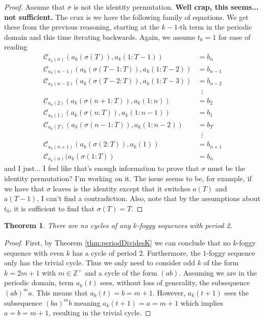 \documentclass{article}
\newtheorem{theorem}{Theorem}
\begin{document}
\begin{proof}
Assume that $\sigma$ is not the identity permutation. \textbf{Well crap, this seems... not sufficient.} The crux is we have the following family of equations. We get these from the previous reasoning, starting at the $k-1$-th term in the periodic domain and this time iterating backwards. Again, we assume $t_0 = 1$ for ease of reading
\begin{align*}
\mathcal{C}_{a_k(n)}(a_k(\sigma(T)), a_k(1:T-1)) &= b_{n} \\
\mathcal{C}_{a_k(n-1)}(a_k(\sigma(T-1:T)), a_k(1:T-2)) &= b_{n-1} \\
\mathcal{C}_{a_k(n-2)}(a_k(\sigma(T-2:T)), a_k(1:T-3)) &= b_{n-2} \\
&\;\;\vdots\\
\mathcal{C}_{a_k(2)}(a_k(\sigma(n+1:T)), a_k(1:n)) &= b_{2} \\
\mathcal{C}_{a_k(1)}(a_k(\sigma(n:T)), a_k(1:n-1)) &= b_{1} \\
\mathcal{C}_{a_k(T)}(a_k(\sigma(n-1:T)), a_k(1:n-2)) &= b_{T} \\
&\;\;\vdots\\
\mathcal{C}_{a_k(n+1)}(a_k(\sigma(2:T)), a_k(1)) &= b_{n+1} \\
\mathcal{C}_{a_k(n)}(a_k(\sigma(1:T)) &= b_{n}
\end{align*}
and I just... I feel like that's enough information to prove that $\sigma$ must be the identity permutation? I'm working on it. The issue seems to be, for example, if we have that $\sigma$ leaves is the identity except that it switches $a(T)$ and $a(T-1)$, I can't find a contradiction. Also, note that by the assumptions about $t_0$, it is sufficient to find that $\sigma(T) = T$. 

\end{proof}

\begin{theorem}
	There are no cycles of any $k$-foggy sequences with period 2.
	\label{thm:no-period-2}
\end{theorem}

\begin{proof}
	First, by Theorem \ref{thm:periodDividesK} we can conclude that no $k$-foggy sequence with even $k$ has a cycle of period $2$. Furthermore, the $1$-foggy sequence only has the trivial cycle. Thus we only need to consider odd $k$ of the form $k = 2m+1$ with $m \in \mathbb{Z}^+$ and a cycle of the form $(ab)$. Assuming we are in the periodic domain, term $a_k(t)$ sees, without loss of generality, the subsequence $(ab)^m a$. This means that $a_k(t) = b = m+1$. However, $a_k(t+1)$ sees the subsequence $(ba)^m b$ meaning $a_k(t+1) = a = m+1$ which implies $a = b = m+1$, resulting in the trivial cycle.
\end{proof}
\end{document}
